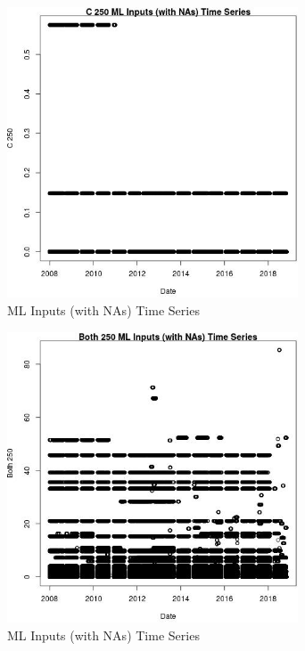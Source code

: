 \begin{figure} 
\centering  
\includegraphics[width=0.77\textwidth]{Code_Outputs/Report_ML_input_PM25_Step4_part_e_de_duplicated_aves_compiled_2019-05-20wNAs_C_250vDate.jpg} 
\caption{\label{fig:Report_ML_input_PM25_Step4_part_e_de_duplicated_aves_compiled_2019-05-20wNAsC_250vDate}ML Inputs (with NAs) Time Series} 
\end{figure} 
 

\begin{figure} 
\centering  
\includegraphics[width=0.77\textwidth]{Code_Outputs/Report_ML_input_PM25_Step4_part_e_de_duplicated_aves_compiled_2019-05-20wNAs_Both_250vDate.jpg} 
\caption{\label{fig:Report_ML_input_PM25_Step4_part_e_de_duplicated_aves_compiled_2019-05-20wNAsBoth_250vDate}ML Inputs (with NAs) Time Series} 
\end{figure} 
 

